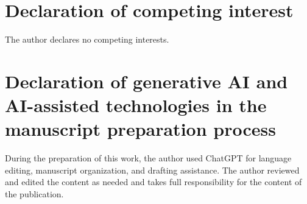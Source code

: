 \documentclass[preprint,12pt,authoryear]{elsarticle}
\begin{document}
\section*{Declaration of competing interest}

The author declares no competing interests.

\section*{Declaration of generative AI and AI-assisted technologies in the manuscript preparation process}

During the preparation of this work, the author used ChatGPT for language editing, manuscript organization, and drafting assistance. The author reviewed and edited the content as needed and takes full responsibility for the content of the publication.
\end{document}
